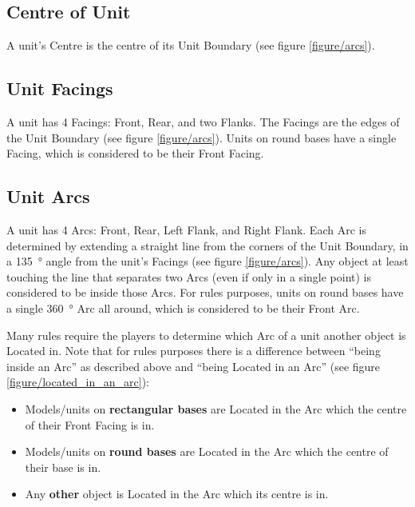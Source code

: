 \subsection{Centre of Unit}
\label{centre_of_unit}

A unit's Centre is the centre of its Unit Boundary (see figure \ref{figure/arcs}).

\subsection{Unit Facings}
\label{unit_facings}

A unit has 4 Facings: Front, Rear, and two Flanks. The Facings are the edges of the Unit Boundary (see figure \ref{figure/arcs}). Units on round bases have a single Facing, which is considered to be their Front Facing.

\subsection{Unit Arcs}
\label{unit_arcs}

A unit has 4 Arcs: Front, Rear, Left Flank, and Right Flank. Each Arc is determined by extending a straight line from the corners of the Unit Boundary, in a \SI{135}{\degree} angle from the unit's Facings (see figure \ref{figure/arcs}). Any object at least touching the line that separates two Arcs (even if only in a single point) is considered to be inside those Arcs. For rules purposes, units on round bases have a single \SI{360}{\degree} Arc all around, which is considered to be their Front Arc.

Many rules require the players to determine which Arc of a unit another object is Located in. Note that for rules purposes there is a difference between \enquote{being inside an Arc} as described above and \enquote{being Located in an Arc} (see figure \ref{figure/located_in_an_arc}):

\begin{itemize}
\item Models/units on \textbf{rectangular bases} are Located in the Arc which the centre of their Front Facing is in.
\item Models/units on \textbf{round bases} are Located in the Arc which the centre of their base is in.
\item Any \textbf{other} object is Located in the Arc which its centre is in.
\end{itemize}

